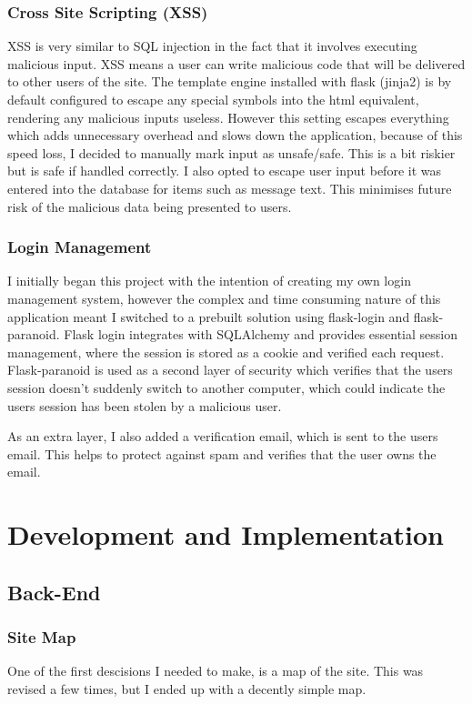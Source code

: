 \documentclass[a4paper,oneside,12pt,draft]{report}
\begin{document}
	\subsection{Cross Site Scripting (XSS)}
	XSS is very similar to SQL injection in the fact that it involves executing malicious input. XSS means a user can write malicious code that will be delivered to other users of the site. The template engine installed with flask (jinja2) is by default configured to escape any special symbols into the html equivalent, rendering any malicious inputs useless. However this setting escapes everything which adds unnecessary overhead and slows down the application, because of this speed loss, I decided to manually mark input as unsafe/safe. This is a bit riskier but is safe if handled correctly. I also opted to escape user input before it was entered into the database for items such as message text. This minimises future risk of the malicious data being presented to users.

	\subsection{Login Management}
	I initially began this project with the intention of creating my own login management system, however the complex and time consuming nature of this application meant I switched to a prebuilt solution using flask-login and flask-paranoid. Flask login integrates with SQLAlchemy and provides essential session management, where the session is stored as a cookie and verified each request. Flask-paranoid is used as a second layer of security which verifies that the users session doesn't suddenly switch to another computer, which could indicate the users session has been stolen by a malicious user.

	As an extra layer, I also added a verification email, which is sent to the users email. This helps to protect against spam and verifies that the user owns the email.
	
	\chapter{Development and Implementation}

	\section{Back-End}

	\subsection{Site Map}
	One of the first descisions I needed to make, is a map of the site. This was revised a few times, but I ended up with a decently simple map.
\end{document}
